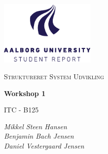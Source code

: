 \begin{titlepage}
    \centering
	\includegraphics[width=0.35\textwidth]{Projectdoc/Assets/Illustrationer/aau_logo_en.pdf}\par\vspace{1cm}
	{\scshape\Large Struktureret System Udvikling\par}
	\vspace{0.2cm}
	{\huge\bfseries Workshop 1\par}
	\vspace{0.2cm}
	{\scshape\Large ITC - B125\par}
	\vspace{2cm}
	{\Large\itshape 
    	Mikkel Steen Hansen\\
        Benjamin Bach Jensen\\
        Daniel Vestergaard Jensen\\
    \par}
	\vfill
	\vfill
\end{titlepage}